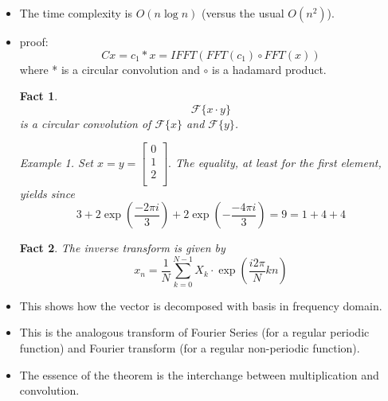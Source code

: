 \documentclass{article}
\newtheorem{fact}{Fact}
\theoremstyle{remark}
\newtheorem{example}{Example}
\begin{document}
\begin{itemize}
\item The time complexity is $O(n\log n)$ (versus the usual $O(n^2)$).
\item proof: 
\[
Cx=c_1 * x=IFFT(FFT(c_1)\circ FFT(x))
\]
where * is a circular convolution and $\circ$ is a hadamard product.
\begin{fact}
\[
\mathcal{F}\{x\cdot y\}
\]
is a circular convolution of $\mathcal{F}\{x\}$ and $\mathcal{F}\{y\}$.
\begin{example}
Set \( x = y = \begin{bmatrix}
    0 \\
    1 \\
    2 \\
    \end{bmatrix}.
     \)
The equality, at least for the first element, yields since
\[
3 + 2\exp\left(\frac{-2\pi i}{3}\right) + 2\exp\left(-\frac{-4\pi i}{3}\right) = 9 = 1 + 4 + 4
\]
\end{example}
\end{fact}
\begin{fact}
The inverse transform is given by
\[
x_n=\frac 1N \sum\limits^{N-1}_{k=0}X_k\cdot \exp(\frac{i2\pi}N kn)
\]
\end{fact}
\item This shows how the vector is decomposed with basis in frequency domain.
\item This is the analogous transform of Fourier 
Series (for a regular periodic function) and Fourier transform 
(for a regular non-periodic function).
\item The essence of the theorem is the interchange between multiplication and convolution.
\end{itemize}
\end{document}
